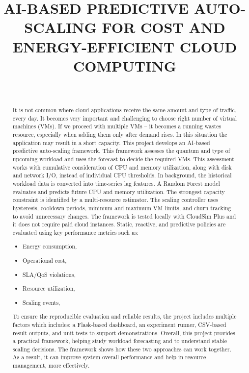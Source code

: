 \documentclass[10pt,journal,compsoc]{IEEEtran}
\begin{document}
\title{AI-BASED PREDICTIVE AUTO-SCALING FOR COST AND ENERGY-EFFICIENT CLOUD COMPUTING}

\author{
    \\
}

\maketitle

\begin{abstract}
It is not common where cloud applications receive the same amount and type of traffic, every day. It becomes very important and challenging to choose right number of virtual machines (VMs). If we proceed with multiple VMs -- it becomes a running wastes resource, especially when adding them only after demand rises. In this situation the application may result in a short capacity. This project develops an AI-based predictive auto-scaling framework. This framework assesses the quantum and type of upcoming workload and uses the forecast to decide the required VMs. This assessment works with cumulative consideration of CPU and memory utilization, along with disk and network I/O, instead of individual CPU thresholds. In background, the historical workload data is converted into time-series lag features. A Random Forest model evaluates and predicts future CPU and memory utilization. The strongest capacity constraint is identified by a multi-resource estimator. The scaling controller uses hysteresis, cooldown periods, minimum and maximum VM limits, and churn tracking to avoid unnecessary changes. The framework is tested locally with CloudSim Plus and it does not require paid cloud instances. Static, reactive, and predictive policies are evaluated using key performance metrics such as:
\begin{itemize}
    \item Energy consumption,
    \item Operational cost,
    \item SLA/QoS violations,
    \item Resource utilization,
    \item Scaling events,
\end{itemize}
To ensure the reproducible evaluation and reliable results, the project includes multiple factors which includes: a Flask-based dashboard, an experiment runner, CSV-based result outputs, and unit tests to support demonstrations. Overall, this project provides a practical framework, helping study workload forecasting and to understand stable scaling decisions. The framework shows how these two approaches can work together. As a result, it can improve system overall performance and help in resource management, more effectively.
\end{abstract}
\end{document}
